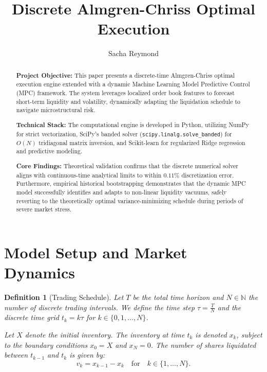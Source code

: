 \documentclass[11pt,a4paper]{article}
\title{Discrete Almgren-Chriss Optimal Execution}
\author{Sacha Reymond}
\date{}
\newtheorem{definition}[theorem]{Definition}
\begin{document}
\maketitle

\begin{abstract}
\noindent \textbf{Project Objective:} This paper presents a discrete-time Almgren-Chriss optimal execution engine extended with a dynamic Machine Learning Model Predictive Control (MPC) framework. The system leverages localized order book features to forecast short-term liquidity and volatility, dynamically adapting the liquidation schedule to navigate microstructural risk.

\vspace{\baselineskip}
\noindent \textbf{Technical Stack:} The computational engine is developed in Python, utilizing NumPy for strict vectorization, SciPy's banded solver (\texttt{scipy.linalg.solve\_banded}) for $O(N)$ tridiagonal matrix inversion, and Scikit-learn for regularized Ridge regression and predictive modeling.

\vspace{\baselineskip}
\noindent \textbf{Core Findings:} Theoretical validation confirms that the discrete numerical solver aligns with continuous-time analytical limits to within $0.11\%$ discretization error. Furthermore, empirical historical bootstrapping demonstrates that the dynamic MPC model successfully identifies and adapts to non-linear liquidity vacuums, safely reverting to the theoretically optimal variance-minimizing schedule during periods of severe market stress.
\end{abstract}

\section{Model Setup and Market Dynamics}

\begin{definition}[Trading Schedule]
Let $T$ be the total time horizon and $N \in \mathbb{N}$ the number of discrete trading intervals. We define the time step $\tau = \frac{T}{N}$ and the discrete time grid $t_k = k \tau$ for $k \in \{0, 1, \dots, N\}$. 

Let $X$ denote the initial inventory. The inventory at time $t_k$ is denoted $x_k$, subject to the boundary conditions $x_0 = X$ and $x_N = 0$. The number of shares liquidated between $t_{k-1}$ and $t_k$ is given by:
\[ v_k = x_{k-1} - x_k \quad \text{for} \quad k \in \{1, \dots, N\}. \]
\end{definition}
\end{document}
